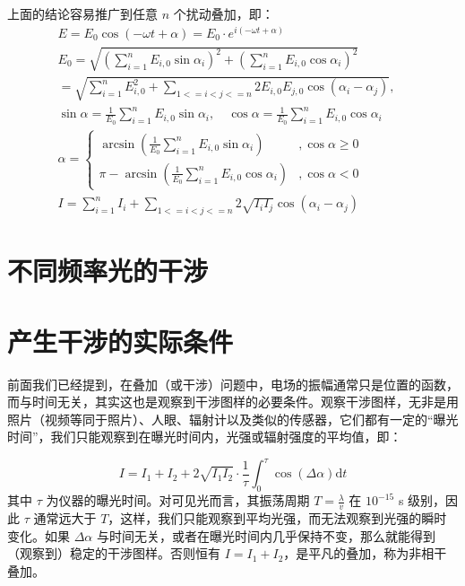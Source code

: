 \documentclass[UTF8]{report}
\theoremstyle{MyLineTheoremStyle} %
\theoremstyle{MyBlockTheoremStyle} %
\theoremstyle{MySubsubsectionStyle} %
\begin{document}
上面的结论容易推广到任意 $n$ 个扰动叠加，即：
\begin{gather}
    E = E_0 \cos \left(-\omega t + \alpha \right) = E_0 \cdot e^{i(-\omega t + \alpha)}
    \\ 
    E_0 = \sqrt{\left( \sum_{i=1}^n E_{i,0}\sin \alpha_i \right)^2 + \left( \sum_{i=1}^n E_{i,0}\cos \alpha_i \right)^2 }   \\ 
    =  \sqrt{\sum_{i=1}^n E_{i,0}^2 + \sum_{1 <= i < j <= n} 2E_{i,0}E_{j,0}\cos(\alpha_i - \alpha_j)},\quad
    \\ 
    \sin \alpha = \frac{1}{E_0}\sum_{i=1}^n E_{i,0}\sin \alpha_i ,\quad 
    \cos \alpha = \frac{1}{E_0}\sum_{i=1}^n E_{i,0}\cos \alpha_i \\ 
    \alpha = 
    \begin{cases}
        \arcsin \left( \frac{1}{E_0}\sum_{i=1}^n E_{i,0}\sin \alpha_i  \right) &, \cos \alpha \geqslant 0 \\
        \pi - \arcsin \left( \frac{1}{E_0}\sum_{i=1}^n E_{i,0}\cos \alpha_i  \right) &,  \cos \alpha < 0
    \end{cases} \\ 
    I = \sum_{i=1}^n I_i + \sum_{1 <= i < j <= n} 2\sqrt{I_iI_j} \cos(\alpha_i - \alpha_j) 
\end{gather}

\section{不同频率光的干涉}

\section{产生干涉的实际条件}

前面我们已经提到，在叠加（或干涉）问题中，电场的振幅通常只是位置的函数，而与时间无关，其实这也是观察到干涉图样的必要条件。观察干涉图样，无非是用照片（视频等同于照片）、人眼、辐射计以及类似的传感器，它们都有一定的“曝光时间”，我们只能观察到在曝光时间内，光强或辐射强度的平均值，即：

\begin{equation}
I = I_1 + I_2 + 2 \sqrt{I_1 I_2} \cdot \frac{1}{\tau} \int_{0}^{\tau}  \cos(\Delta \alpha) \mathrm{d} t
\end{equation}
其中 $\tau$ 为仪器的曝光时间。对可见光而言，其振荡周期 $T = \frac{\lambda}{v}$ 在 $10^{-15}$ s 级别，因此 $\tau$ 通常远大于 $T$，这样，我们只能观察到平均光强，而无法观察到光强的瞬时变化。如果 $\Delta \alpha$ 与时间无关，或者在曝光时间内几乎保持不变，那么就能得到（观察到）稳定的干涉图样。否则恒有 $I = I_1 + I_2$，是平凡的叠加，称为非相干叠加。
\end{document}
